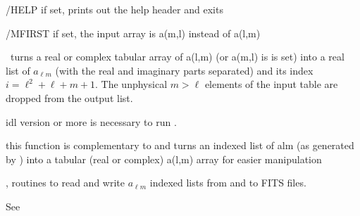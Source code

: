 \begin{keywords}
  \begin{kwlist}{} %
    \item[/HELP] %
	if set, prints out the help header and exits
    \item[/MFIRST] %
 if set, the input array is a(m,l) instead of a(l,m)
  \end{kwlist}
\end{keywords}  

\begin{codedescription}
{%
\thedocid\ turns a real or complex tabular array of a(l,m) (or a(m,l) is  is
set) into a real list of $a_{\ell m}$ (with the real and imaginary parts separated)
and its index $i=\ell^2+\ell+m+1$. The unphysical $m>\ell$ elements of the input
table are dropped from the output list.
}
\end{codedescription}



\begin{related}
  \begin{sulist}{} %
    \item[idl] version \idlversion or more is necessary to run \thedocid.
    \item[\htmlref{alm\_i2t}{idl:alm_i2t}] this function is complementary to
\thedocid{} and
turns an indexed list of alm (as generated by
) into a tabular (real or complex) a(l,m) array
for easier manipulation
  \item[\htmlref{alm2fits}{idl:alm2fits}, \htmlref{fits2alm}{idl:fits2alm}]
routines to read and write $a_{\ell m}$ indexed lists from and to FITS files.
  \end{sulist}
\end{related}

\begin{example}
{%
}%
{%
See 
}
\end{example}


